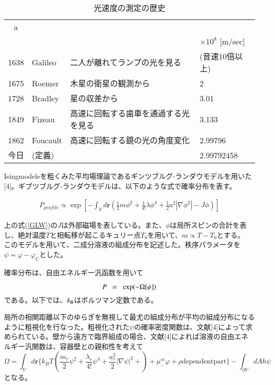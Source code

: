\documentclass[a4paper,12pt, oneside, openany]{jsbook}
\begin{document}
\begin{table}[h]
 \caption{光速度の測定の歴史}
 \label{table:SpeedOfLight}
 \centering
  \begin{tabular}{clll}
   \hline
   a \\
    & & & $\times 10^8$ [m/sec] \\
   \hline \hline
   1638 & Galileo & 二人が離れてランプの光を見る & (音速10倍以上) \\
   1675 & Roemer & 木星の衛星の観測から & 2 \\
   1728 & Bradley & 星の収差から & 3.01 \\
   1849 & Fizeau & 高速に回転する歯車を通過する光を見る & 3.133 \\
   1862 & Foucault & 高速に回転する鏡の光の角度変化 & 2.99796 \\
   今日 & (定義) & & 2.99792458 \\
   \hline
  \end{tabular}
\end{table}

Isingmodeleを粗くみた平均場理論であるギンツブルグ-ランダウモデルを用いた[4]。ギブツブルグ-ランダウモデルは、以下のような式で確率分布を表す。

\begin{align}\label{GLW}
P_{profile} \propto \exp\left[-\int_V d\boldsymbol{r} \left(\frac{1}{2}m \phi^2+\frac{1}{4!} \lambda\phi^4+\frac{1}{2}a^2|\nabla\phi^2|-J\phi\right)\right]
\end{align}

\noindent 上の式(\ref{GLW})の$J$は外部磁場を表している。また、$\phi$は局所スピンの合計を表し、絶対温度$T$と相転移が起こるキュリー点$T_0$を用いて、$m \propto T-T_0$とする。\\
このモデルを用いて、二成分溶液の組成分布を記述した。秩序パラメータを$\psi=\varphi-\varphi_\mathrm{C}$とした。

\newpage
確率分布は、自由エネルギー汎函数を用いて

\begin{equation}\label{6}
P \hspace{2mm}\propto \hspace{2mm} \exp(-\Omega[\psi])
\end{equation}
である。以下では、$k_{\rm B}$はボルツマン定数である。


局所の相関距離以下のゆらぎを無視して最尤の組成分布が平均の組成分布になるように粗視化を行なった。粗視化された$\psi$の確率密度関数は、文献[4]によって求められている。壁から遠方で臨界組成の場合、文献[4]によれば溶液の自由エネルギー汎関数は、容器壁との親和性を考えて
\begin{equation}\label{7}
\Omega=\int_V d\boldsymbol{r}\biggr\{k_BT\left(\frac{m_r}{2}\psi^2+\frac{\lambda_r}{4!}\psi^4+\frac{a_r^2}{2}|\nabla\psi|^2 +\right)+\mu_-^{cc}\varphi+\rho \mathrm{dependentpart}\biggr\}-\int_{\partial V}dAh\psi
\end{equation}
となる。
\end{document}
